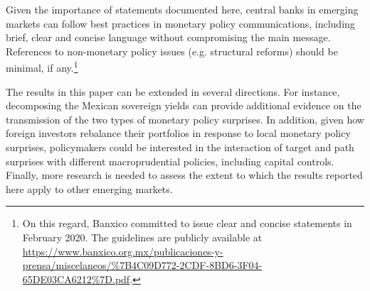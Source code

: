 \documentclass[a4paper, 12pt]{article}
\begin{document}
Given the importance of statements documented here, central banks in emerging markets can follow best practices in monetary policy communications, including brief, clear and concise language without compromising the main message. References to non-monetary policy issues (e.g. structural reforms) should be minimal, if any.\footnote{On this regard, Banxico committed to issue clear and concise statements in February 2020. The guidelines are publicly available at  \url{https://www.banxico.org.mx/publicaciones-y-prensa/miscelaneos/\%7B4C09D772-2CDF-8BD6-3F04-65DE03CA6212\%7D.pdf}.}

The results in this paper can be extended in several directions. 
For instance, decomposing the Mexican sovereign yields can provide additional evidence on the transmission of the two types of monetary policy surprises. In addition, given how foreign investors rebalance their portfolios in response to local monetary policy surprises, policymakers could be interested in the interaction of target and path surprises with different macroprudential policies, including capital controls. Finally, more research is needed to assess the extent to which the results reported here apply to other emerging markets.


\uspunctuation
\begin{singlespace}
	\printbibliography
\end{singlespace}
\end{document}
